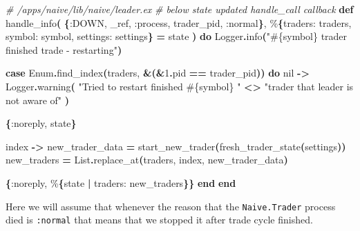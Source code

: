 \documentclass[
  oneside]{book}
\newenvironment{Shaded}{\begin{snugshade}}{\end{snugshade}}
\newcommand{\CommentTok}[1]{\textcolor[rgb]{0.56,0.35,0.01}{\textit{#1}}}
\newcommand{\ConstantTok}[1]{\textcolor[rgb]{0.56,0.35,0.01}{#1}}
\newcommand{\DecValTok}[1]{\textcolor[rgb]{0.00,0.00,0.81}{#1}}
\newcommand{\FunctionTok}[1]{\textcolor[rgb]{0.13,0.29,0.53}{\textbf{#1}}}
\newcommand{\KeywordTok}[1]{\textcolor[rgb]{0.13,0.29,0.53}{\textbf{#1}}}
\newcommand{\NormalTok}[1]{#1}
\newcommand{\OperatorTok}[1]{\textcolor[rgb]{0.81,0.36,0.00}{\textbf{#1}}}
\newcommand{\OtherTok}[1]{\textcolor[rgb]{0.56,0.35,0.01}{#1}}
\newcommand{\StringTok}[1]{\textcolor[rgb]{0.31,0.60,0.02}{#1}}
\newcommand{\VariableTok}[1]{\textcolor[rgb]{0.00,0.00,0.00}{#1}}
\begin{document}
\begin{Shaded}
\begin{Highlighting}[]
  \CommentTok{\# /apps/naive/lib/naive/leader.ex}
  \CommentTok{\# below state updated handle\_call callback}
  \KeywordTok{def}\NormalTok{ handle\_info}\FunctionTok{(}
        \FunctionTok{\{}\VariableTok{:DOWN}\NormalTok{, \_ref, }\VariableTok{:process}\NormalTok{, trader\_pid, }\VariableTok{:normal}\FunctionTok{\}}\NormalTok{,}
\NormalTok{        \%}\FunctionTok{\{}\VariableTok{traders:}\NormalTok{ traders, }\VariableTok{symbol:}\NormalTok{ symbol, }\VariableTok{settings:}\NormalTok{ settings}\FunctionTok{\}} \OperatorTok{=}\NormalTok{ state}
      \FunctionTok{)} \KeywordTok{do}
    \ConstantTok{Logger}\OperatorTok{.}\NormalTok{info}\FunctionTok{(}\StringTok{"}\OtherTok{\#\{}\NormalTok{symbol}\OtherTok{\}}\StringTok{ trader finished trade {-} restarting"}\FunctionTok{)}

    \KeywordTok{case} \ConstantTok{Enum}\OperatorTok{.}\NormalTok{find\_index}\FunctionTok{(}\NormalTok{traders, }\OperatorTok{\&}\FunctionTok{(}\OperatorTok{\&}\DecValTok{1}\OperatorTok{.}\NormalTok{pid }\OperatorTok{==}\NormalTok{ trader\_pid}\FunctionTok{))} \KeywordTok{do}
      \ConstantTok{nil} \OperatorTok{{-}\textgreater{}}
        \ConstantTok{Logger}\OperatorTok{.}\NormalTok{warning}\FunctionTok{(}
          \StringTok{"Tried to restart finished }\OtherTok{\#\{}\NormalTok{symbol}\OtherTok{\}}\StringTok{ "} \OperatorTok{\textless{}\textgreater{}}
            \StringTok{"trader that leader is not aware of"}
        \FunctionTok{)}

        \FunctionTok{\{}\VariableTok{:noreply}\NormalTok{, state}\FunctionTok{\}}

\NormalTok{      index }\OperatorTok{{-}\textgreater{}}
\NormalTok{        new\_trader\_data }\OperatorTok{=}\NormalTok{ start\_new\_trader}\FunctionTok{(}\NormalTok{fresh\_trader\_state}\FunctionTok{(}\NormalTok{settings}\FunctionTok{))}
\NormalTok{        new\_traders }\OperatorTok{=} \ConstantTok{List}\OperatorTok{.}\NormalTok{replace\_at}\FunctionTok{(}\NormalTok{traders, index, new\_trader\_data}\FunctionTok{)}

        \FunctionTok{\{}\VariableTok{:noreply}\NormalTok{, \%}\FunctionTok{\{}\NormalTok{state }\OperatorTok{|} \VariableTok{traders:}\NormalTok{ new\_traders}\FunctionTok{\}\}}
    \KeywordTok{end}
  \KeywordTok{end}
\end{Highlighting}
\end{Shaded}

Here we will assume that whenever the reason that the \texttt{Naive.Trader} process died is \texttt{:normal} that means that we stopped it after trade cycle finished.
\end{document}
